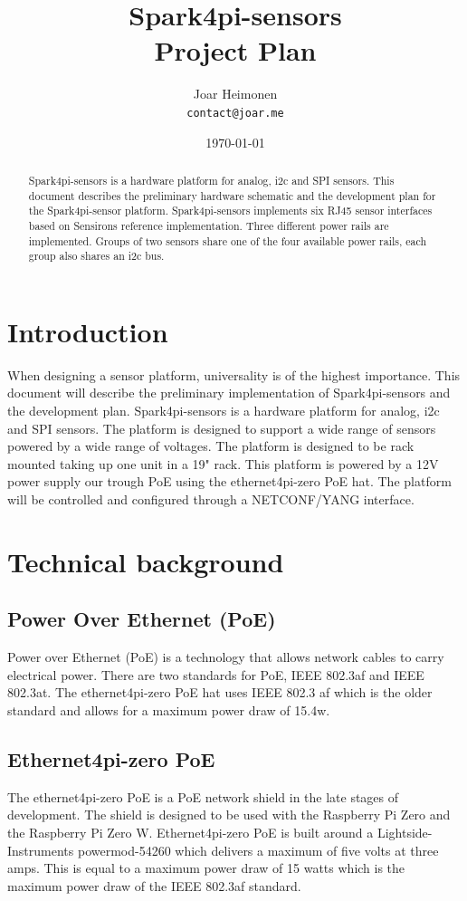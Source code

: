 \documentclass[12pt]{article}
\author{
    Joar Heimonen\\
    \texttt{contact@joar.me}
}
\title{
    \textbf{Spark4pi-sensors}\\[0.5em]
    \large Project Plan
}
\date{\today}
\begin{document}
\maketitle

\begin{abstract}
    \noindent Spark4pi-sensors is a hardware platform for analog, i2c and SPI sensors. 
    This document describes the preliminary hardware schematic and the development plan for the Spark4pi-sensor platform. 
    Spark4pi-sensors implements six RJ45 sensor interfaces based on Sensirons reference implementation. 
    Three different power rails are implemented. Groups of two sensors share one of the four available
    power rails, each group also shares an i2c bus.
\end{abstract}

\pagebreak

\tableofcontents

\pagebreak


\section{Introduction}
When designing a sensor platform, universality is of the highest importance. This document will describe the preliminary implementation of Spark4pi-sensors and the development plan.
Spark4pi-sensors is a hardware platform for analog, i2c and SPI sensors. The platform is designed to support a wide range of sensors powered by a wide range of voltages.
The platform is designed to be rack mounted taking up one unit in a 19" rack. This platform is powered by a 12V power supply our trough PoE using the ethernet4pi-zero PoE hat.
The platform will be controlled and configured through a NETCONF/YANG interface. 


\section{Technical background}
\subsection{Power Over Ethernet (PoE)}
Power over Ethernet (PoE) is a technology that allows network cables to carry electrical power. 
There are two standards for PoE, IEEE 802.3af and IEEE 802.3at. The ethernet4pi-zero PoE hat uses IEEE 802.3 af which 
is the older standard and allows for a maximum power draw of 15.4w.

\subsection{Ethernet4pi-zero PoE}
The ethernet4pi-zero PoE is a PoE network shield in the late stages of development.
The shield is designed to be used with the Raspberry Pi Zero and the Raspberry Pi Zero W.
Ethernet4pi-zero PoE is built around a Lightside-Instruments powermod-54260 which delivers a maximum of five volts at three amps.
This is equal to a maximum power draw of 15 watts which is the maximum power draw of the IEEE 802.3af standard.
\end{document}

